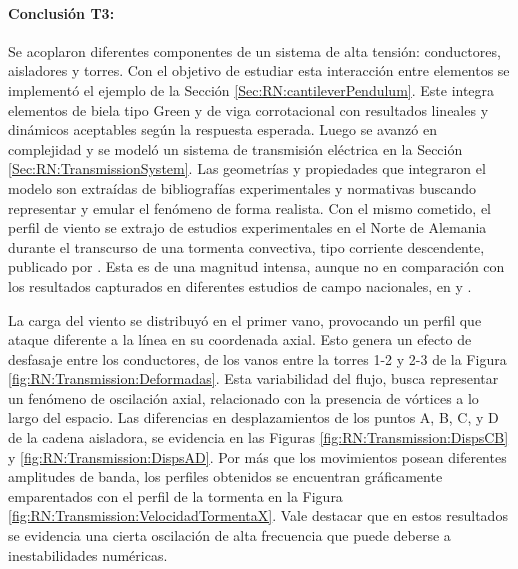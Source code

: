 \paragraph*{Conclusión T3:}
Se acoplaron diferentes componentes de un sistema de alta tensión: conductores, aisladores y torres. Con el objetivo de estudiar esta interacción entre elementos se implementó el ejemplo de la Sección \ref{Sec:RN:cantileverPendulum}. Este integra elementos de biela tipo Green y de viga corrotacional con resultados lineales y dinámicos aceptables según la respuesta esperada. Luego se avanzó en complejidad y se modeló un sistema de transmisión eléctrica en la Sección \ref{Sec:RN:TransmissionSystem}. Las geometrías y propiedades que integraron el modelo son extraídas de bibliografías experimentales y normativas buscando representar y emular el fenómeno de forma realista.  Con el mismo cometido, el perfil de viento se extrajo de estudios experimentales en el Norte de Alemania durante el transcurso de una tormenta convectiva, tipo corriente descendente, publicado por \cite{stengel2017measurements}. Esta es de una magnitud intensa, aunque no en comparación con los resultados capturados en diferentes estudios de campo nacionales, en \citep{duranona2009analysis} y \citep{duranona2019first}.

La carga del viento se distribuyó en el primer vano, provocando un perfil que ataque diferente a la línea en su coordenada axial. Esto genera un efecto de desfasaje entre los conductores, de los vanos entre la torres 1-2 y 2-3 de la Figura \ref{fig:RN:Transmission:Deformadas}. Esta variabilidad del flujo, busca representar un fenómeno de oscilación axial, relacionado con la presencia de vórtices a lo largo del espacio. Las diferencias en desplazamientos de los puntos A, B, C, y D de la cadena aisladora, se evidencia en las Figuras \ref{fig:RN:Transmission:DispsCB} y \ref{fig:RN:Transmission:DispsAD}. Por más que los movimientos posean diferentes amplitudes de banda, los perfiles obtenidos se encuentran gráficamente emparentados con el perfil de la tormenta en la Figura \ref{fig:RN:Transmission:VelocidadTormentaX}. Vale destacar que en estos resultados se evidencia una cierta oscilación de alta frecuencia que puede deberse a inestabilidades numéricas.  

